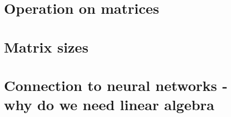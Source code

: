 \documentclass[11pt]{article}
\begin{document}
    \section{Operation on matrices}\label{operation-on-matrices}

    \section{Matrix sizes}\label{matrix-sizes}

    \section{Connection to neural networks - why do we need linear
algebra}\label{connection-to-neural-networks---why-do-we-need-linear-algebra}


    
    
    
    
\end{document}

